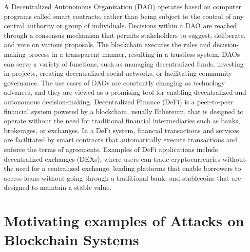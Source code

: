 A Decentralized Autonomous Organization (DAO) operates based on computer programs called smart contracts, rather than being subject to the control of any central authority or group of individuals. Decisions within a DAO are reached through a consensus mechanism that permits stakeholders to suggest, deliberate, and vote on various proposals. The blockchain executes the rules and decision-making process in a transparent manner, resulting in a trustless system.
DAOs can serve a variety of functions, such as managing decentralized funds, investing in projects, creating decentralized social networks, or facilitating community governance. The use cases of DAOs are constantly changing as technology advances, and they are viewed as a promising tool for enabling decentralized and autonomous decision-making.
Decentralized Finance (DeFi) is a peer-to-peer financial system powered by a blockchain, usually Ethereum, that is designed to operate without the need for traditional financial intermediaries such as banks, brokerages, or exchanges.
In a DeFi system, financial transactions and services are facilitated by smart contracts that automatically execute transactions and enforce the terms of agreements. Examples of DeFi applications include decentralized exchanges (DEXs), where users can trade cryptocurrencies without the need for a centralized exchange, lending platforms that enable borrowers to access loans without going through a traditional bank, and stablecoins that are designed to maintain a stable value.

\section{Motivating examples of Attacks on Blockchain Systems}

